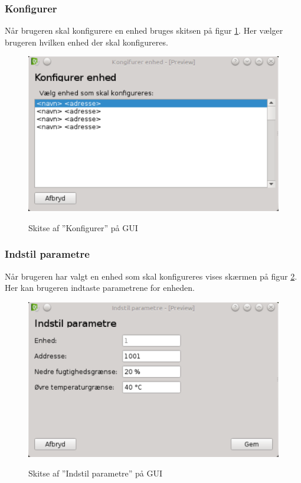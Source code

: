 \subsubsection{Konfigurer}
Når brugeren skal konfigurere en enhed bruges skitsen på figur \ref{fig:GUI-konfigurer}. Her vælger brugeren hvilken enhed der skal konfigureres.

\begin{figure}[htbp] \centering
{\includegraphics[scale=0.5]{filer/pics/GUI/Konfigurer-enhed}}
\caption{Skitse af ''Konfigurer'' på GUI}
\label{fig:GUI-konfigurer}
\end{figure}

\subsubsection{Indstil parametre}
Når brugeren har valgt en enhed som skal konfigureres vises skærmen på figur \ref{fig:GUI-indstil-parametre}. Her kan brugeren indtaste parametrene for enheden.

\begin{figure}[htbp] \centering
{\includegraphics[scale=0.5]{filer/pics/GUI/Indstil-parametre}}
\caption{Skitse af ''Indstil parametre'' på GUI}
\label{fig:GUI-indstil-parametre}
\end{figure}

